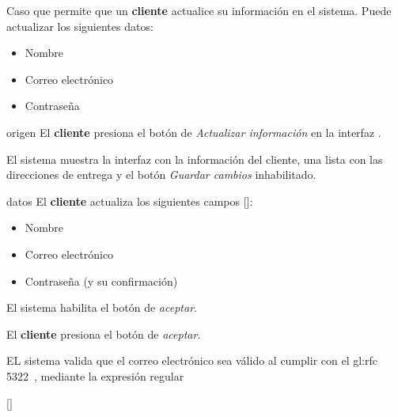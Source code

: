 %
%

{
  Caso que permite que un \textbf{cliente} actualice su información en el
  sistema. Puede actualizar los siguientes datos:
  \begin{itemize}
    \item Nombre
    \item Correo electrónico
    \item Contraseña
  \end{itemize}

  \begin{trayectoriaPrincipal}

    \item[origen] El \textbf{cliente} presiona el botón de
      \textit{Actualizar información} en la interfaz
      .

    \item El sistema muestra la interfaz
       con la información
      del cliente, una lista con las direcciones de entrega y el botón
      \textit{Guardar cambios} inhabilitado.

    \item[datos] El \textbf{cliente} actualiza los siguientes campos
      []:
      \begin{itemize}
        \item Nombre
        \item Correo electrónico
        \item Contraseña (y su confirmación)
      \end{itemize}

    \item El sistema habilita el botón de \textit{aceptar}.

    \item El \textbf{cliente} presiona el botón de \textit{aceptar}.

    \item EL sistema valida que el correo electrónico sea válido
      al cumplir con el \gls{gl:rfc}
      5322~\cite{DBLP:journals/rfc/rfc5322}, mediante la expresión
      regular


      []


\end{trayectoriaPrincipal}}
